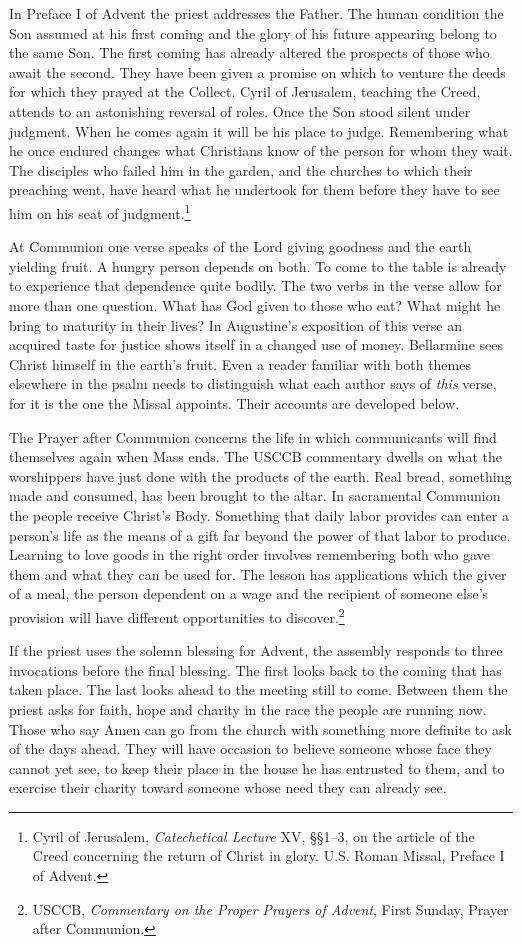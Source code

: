 In Preface I of Advent the priest addresses the Father. The human condition the Son assumed at his first coming and the glory of his future appearing belong to the same Son. The first coming has already altered the prospects of those who await the second. They have been given a promise on which to venture the deeds for which they prayed at the Collect. Cyril of Jerusalem, teaching the Creed, attends to an astonishing reversal of roles. Once the Son stood silent under judgment. When he comes again it will be his place to judge. Remembering what he once endured changes what Christians know of the person for whom they wait. The disciples who failed him in the garden, and the churches to which their preaching went, have heard what he undertook for them before they have to see him on his seat of judgment.\footnote{Cyril of Jerusalem, \textit{Catechetical Lecture} XV, §§1--3, on the article of the Creed concerning the return of Christ in glory. U.S. Roman Missal, Preface I of Advent.}

At Communion one verse speaks of the Lord giving goodness and the earth yielding fruit. A hungry person depends on both. To come to the table is already to experience that dependence quite bodily. The two verbs in the verse allow for more than one question. What has God given to those who eat? What might he bring to maturity in their lives? In Augustine's exposition of this verse an acquired taste for justice shows itself in a changed use of money. Bellarmine sees Christ himself in the earth's fruit. Even a reader familiar with both themes elsewhere in the psalm needs to distinguish what each author says of \emph{this} verse, for it is the one the Missal appoints. Their accounts are developed below.

The Prayer after Communion concerns the life in which communicants will find themselves again when Mass ends. The USCCB commentary dwells on what the worshippers have just done with the products of the earth. Real bread, something made and consumed, has been brought to the altar. In sacramental Communion the people receive Christ's Body. Something that daily labor provides can enter a person's life as the means of a gift far beyond the power of that labor to produce. Learning to love goods in the right order involves remembering both who gave them and what they can be used for. The lesson has applications which the giver of a meal, the person dependent on a wage and the recipient of someone else's provision will have different opportunities to discover.\footnote{USCCB, \textit{Commentary on the Proper Prayers of Advent}, First Sunday, Prayer after Communion.}

If the priest uses the solemn blessing for Advent, the assembly responds to three invocations before the final blessing. The first looks back to the coming that has taken place. The last looks ahead to the meeting still to come. Between them the priest asks for faith, hope and charity in the race the people are running now. Those who say Amen can go from the church with something more definite to ask of the days ahead. They will have occasion to believe someone whose face they cannot yet see, to keep their place in the house he has entrusted to them, and to exercise their charity toward someone whose need they can already see.
